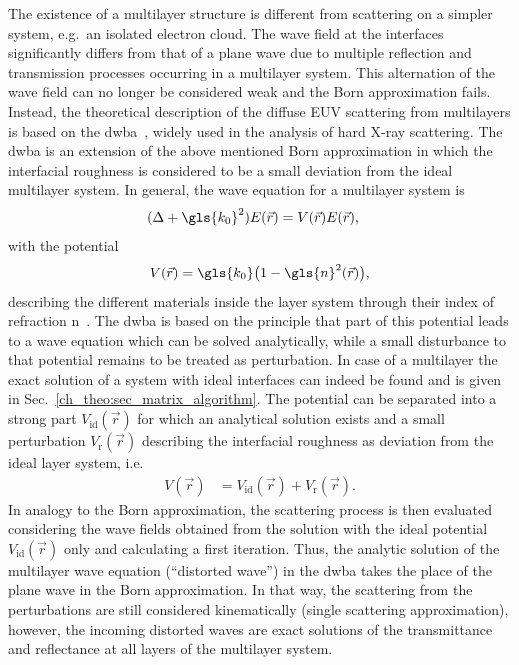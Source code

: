 The existence of a multilayer structure is different from scattering on a simpler system, e.g.~an isolated electron cloud. The wave field at the interfaces significantly differs from that of a plane wave due to multiple reflection and transmission processes occurring in a multilayer system. This alternation of the wave field can no longer be considered weak and the Born approximation fails. Instead, the theoretical description of the diffuse EUV scattering from multilayers is based on the \gls{dwba}~\cite{holy_nonspecular_1994,holy_x-ray_1993}, widely used in the analysis of hard X-ray scattering. The \gls{dwba} is an extension of the above mentioned Born approximation in which the interfacial roughness is considered to be a small deviation from the ideal multilayer system. In general, the wave equation for a multilayer system is
\begin{align}
        (\Delta + \gls{k_0}^2) E(\vec{r}) &= V(\vec{r}) E(\vec{r})\text{,} \label{ch_theo:eqn_multilayer_wave_equation} 
\end{align}
with the potential
\begin{align}
V(\vec{r}) = \gls{k_0}\big(1-\gls{n}^2(\vec{r})\big) \text{,} \label{ch_theo:eqn_potential_inside_layer}
\end{align}
describing the different materials inside the layer system through their index of refraction \gls{n}~\cite{pietsch_high-resolution_2004}. The \gls{dwba} is based on the principle that part of this potential leads to a wave equation which can be solved analytically, while a small disturbance to that potential remains to be treated as perturbation. In case of a multilayer the exact solution of a system with ideal interfaces can indeed be found and is given in Sec.~\ref{ch_theo:sec_matrix_algorithm}. The potential can be separated into a strong part $V_\text{id}(\vec{r})$ for which an analytical solution exists and a small perturbation $V_\text{r}(\vec{r})$ describing the interfacial roughness as deviation from the ideal layer system, i.e.
\begin{align}
V(\vec{r}) &= V_\text{id}(\vec{r}) + V_\text{r}(\vec{r})\text{.} \label{ch_theo:eqn_ideal_and_pertubation_potential}
\end{align}
In analogy to the Born approximation, the scattering process is then evaluated considering the wave fields obtained from the solution with the ideal potential $V_\text{id}(\vec{r})$ only and calculating a first iteration. Thus, the analytic solution of the multilayer wave equation (``distorted wave'') in the \gls{dwba} takes the place of the plane wave in the Born approximation. In that way, the scattering from the perturbations are still considered kinematically (single scattering approximation), however, the incoming distorted waves are exact solutions of the transmittance and reflectance at all layers of the multilayer system.

